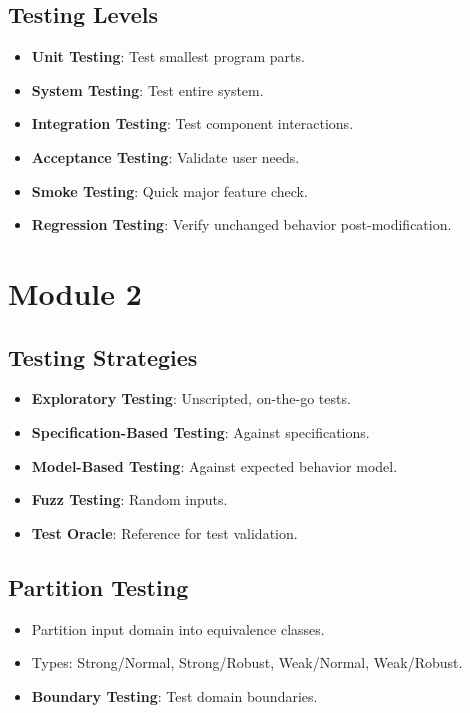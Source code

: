 \documentclass[10pt,portrait]{article}
\begin{document}
\begin{multicols}{ 2 }
\subsection*{Testing Levels}
\begin{itemize}
    \item \textbf{Unit Testing}: Test smallest program parts.
    \item \textbf{System Testing}: Test entire system.
    \item \textbf{Integration Testing}: Test component interactions.
    \item \textbf{Acceptance Testing}: Validate user needs.
    \item \textbf{Smoke Testing}: Quick major feature check.
    \item \textbf{Regression Testing}: Verify unchanged behavior post-modification.
\end{itemize}

\section*{Module 2}

\subsection*{Testing Strategies}
\begin{itemize}
    \item \textbf{Exploratory Testing}: Unscripted, on-the-go tests.
    \item \textbf{Specification-Based Testing}: Against specifications.
    \item \textbf{Model-Based Testing}: Against expected behavior model.
    \item \textbf{Fuzz Testing}: Random inputs.
    \item \textbf{Test Oracle}: Reference for test validation.
\end{itemize}

\subsection*{Partition Testing}
\begin{itemize}
    \item Partition input domain into equivalence classes.
    \item Types: Strong/Normal, Strong/Robust, Weak/Normal, Weak/Robust.
    \item \textbf{Boundary Testing}: Test domain boundaries.
\end{itemize}


\end{multicols}
\end{document}
